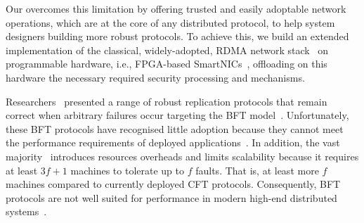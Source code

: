 Our \projecttitle{} overcomes this limitation by offering  trusted and easily adoptable network operations, which are at the core of any distributed protocol, to help system designers building more robust protocols. To achieve this, we build an extended implementation of the classical, widely-adopted, RDMA network stack~\cite{rdma} on programmable hardware, i.e., FPGA-based SmartNICs~\cite{u280_smartnics}, offloading on this hardware the necessary required security processing and mechanisms. 



 Researchers~\cite{Castro:2002, DBLP:journals/corr/abs-1803-05069, 10.1145/1658357.1658358} presented a range of robust replication protocols that remain correct when arbitrary failures occur targeting the BFT model~\cite{Lamport:1982}. Unfortunately, these BFT protocols have recognised little adoption because they cannot meet the performance requirements of deployed applications~\cite{bft-time-is-now}. In addition, the vast majority~\cite{Castro:2002, DBLP:journals/corr/abs-1803-05069} introduces resources overheads and limits scalability because it requires at least $3f+1$ machines to tolerate up to $f$ faults. That is, at least more $f$ machines compared to currently deployed CFT protocols. Consequently, BFT protocols are not well suited for performance in modern high-end distributed systems~\cite{bftForSkeptics}.

